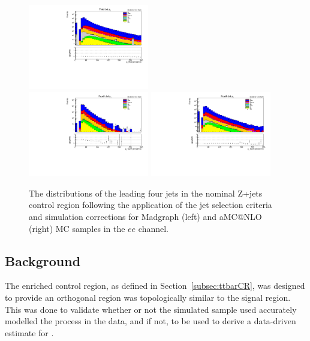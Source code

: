 \begin{figure}[tbp]
\includegraphics[width=0.47\textwidth]{figs/background-estimation/plots/unblinded/DY_control_old_prompt_ee_DYamcatnlo_noSF/thirdJetPt_jetSel.pdf}
\\
\includegraphics[width=0.47\textwidth]{figs/background-estimation/plots/unblinded/DY_control_old_prompt_ee_ttbarInc/fourthJetPt_jetSel.pdf}
\includegraphics[width=0.47\textwidth]{figs/background-estimation/plots/unblinded/DY_control_old_prompt_ee_DYamcatnlo_noSF/fourthJetPt_jetSel.pdf}
\caption{
The distributions of the leading four jets \pt in the nominal Z+jets control region following the application of the jet selection criteria and simulation corrections for Madgraph (left) and aMC@NLO (right) MC samples in the $ee$ channel.
}
\label{fig:zPlusCR_jetPt}
\end{figure}


\subsection{\ttbar Background}\label{subsec:ttbarEstimation}
The \ttbar enriched control region, as defined in Section~\ref{subsec:ttbarCR}, was designed to provide an orthogonal region was topologically similar to the signal region.
This was done to validate whether or not the simulated \ttbar sample used accurately modelled the \ttbar process in the data, and if not, to be used to derive a data-driven estimate for \ttbar.

